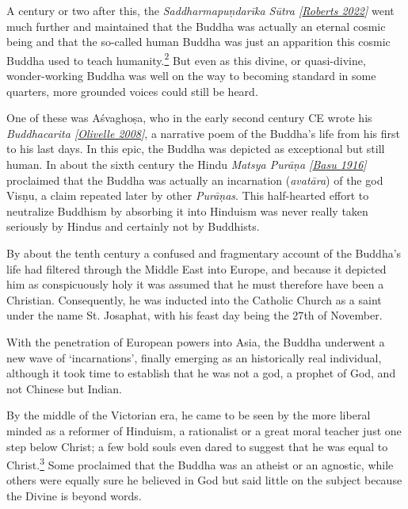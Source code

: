 A century or two after this, the \emph{{Saddharmapuṇdarīka Sūtra
{{[}\hyperref[footprints_split_023.htmlux5cux23Robertsux5cux25202022]{Roberts
2022}{]}}}} went much further and maintained that the Buddha was
actually an eternal cosmic being and that the so-called human Buddha was
just an apparition this cosmic Buddha used to teach
humanity.\label{footprints_split_005.html_fnref2}\hyperref[footprints_split_024.htmlux5cux23fn2]{\textsuperscript{2}}
But even as this divine, or quasi-divine, wonder-working Buddha was well
on the way to becoming standard in some quarters, more grounded voices
could still be heard.

One of these was Aśvaghoṣa, who in the early second century CE wrote his
\emph{{Buddhacarita
{{[}\hyperref[footprints_split_023.htmlux5cux23Olivelleux5cux25202008]{Olivelle
2008}{]}}}}, a narrative poem of the Buddha's life from his first to his
last days. In this epic, the Buddha was depicted as exceptional but
still human. In about the sixth century the Hindu \emph{{Matsya Purāṇa
{{[}\hyperref[footprints_split_023.htmlux5cux23Basuux5cux25201916]{Basu
1916}{]}}}} proclaimed that the Buddha was actually an incarnation
(\emph{avatāra}) of the god Visṇu, a claim repeated later by other
\emph{Purāṇas}. This half-hearted effort to neutralize Buddhism by
absorbing it into Hinduism was never really taken seriously by Hindus
and certainly not by Buddhists.

By about the tenth century a confused and fragmentary account of the
Buddha's life had filtered through the Middle East into Europe, and
because it depicted him as conspicuously holy it was assumed that he
must therefore have been a Christian. Consequently, he was inducted into
the Catholic Church as a saint under the name St. Josaphat, with his
feast day being the 27{th} of November.

With the penetration of European powers into Asia, the Buddha underwent
a new wave of `incarnations', finally emerging as an historically real
individual, although it took time to establish that he was not a god, a
prophet of God, and not Chinese but Indian.

By the middle of the Victorian era, he came to be seen by the more
liberal minded as a reformer of Hinduism, a rationalist or a great moral
teacher just one step below Christ; a few bold souls even dared to
suggest that he was equal to
Christ.\label{footprints_split_005.html_fnref3}\hyperref[footprints_split_024.htmlux5cux23fn3]{\textsuperscript{3}}
Some proclaimed that the Buddha was an atheist or an agnostic, while
others were equally sure he believed in God but said little on the
subject because the Divine is beyond words.

